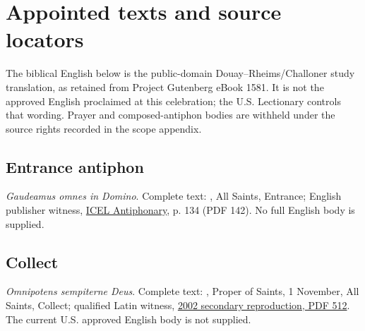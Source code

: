 \section{Appointed texts and source locators}
The biblical English below is the public-domain Douay--Rheims/Challoner study translation, as retained from Project Gutenberg eBook 1581. It is not the approved English proclaimed at this celebration; the U.S. Lectionary controls that wording. Prayer and composed-antiphon bodies are withheld under the source rights recorded in the scope appendix.

\subsection{Entrance antiphon}
\label{proper-entrance-antiphon}
\textit{Gaudeamus omnes in Domino}. Complete text: , All Saints, Entrance; English publisher witness, \href{https://www.liturgyoffice.org.uk/Missal/Music/Antiphonary.pdf}{ICEL Antiphonary}, p. 134 (PDF 142). No full English body is supplied.

\subsection{Collect}
\label{proper-collect}
\textit{Omnipotens sempiterne Deus}. Complete text: , Proper of Saints, 1 November, All Saints, Collect; qualified Latin witness, \href{https://media.musicasacra.com/books/latin_missal2002.pdf#page=512}{2002 secondary reproduction, PDF 512}. The current U.S. approved English body is not supplied.


